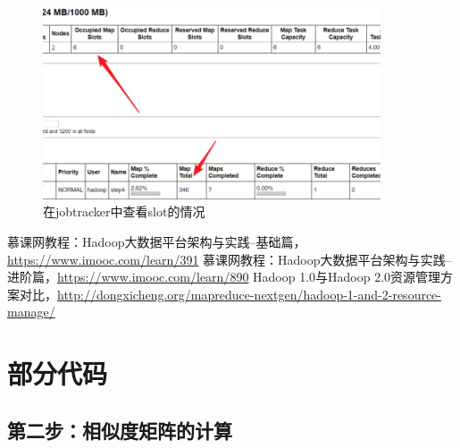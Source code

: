 \documentclass[forprint]{myreport}
\begin{document}
\begin{figure}[htp]
  \centering
  \includegraphics[width=10cm]{"./figure/2018-07-03-15-16-59.png"}
  \caption{在jobtracker中查看slot的情况}
  \label{fig:show-jobtracker-slot}
\end{figure}





\cleardoublepage{}
{}




\begin{thebibliography}{00}
   慕课网教程：Hadoop大数据平台架构与实践--基础篇，\url{https://www.imooc.com/learn/391}
   慕课网教程：Hadoop大数据平台架构与实践--进阶篇，\url{https://www.imooc.com/learn/890}
   Hadoop 1.0与Hadoop 2.0资源管理方案对比，\url{http://dongxicheng.org/mapreduce-nextgen/hadoop-1-and-2-resource-manage/}

\end{thebibliography}
\appendix

\chapter{部分代码}

\section{第二步：相似度矩阵的计算}\label{sec:cal-similarity}
\end{document}
